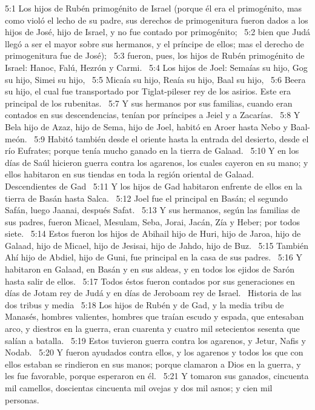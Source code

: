 5:1 Los hijos de Rubén primogénito de Israel (porque él era el primogénito, mas como violó el lecho de su padre, sus derechos de primogenitura fueron dados a los hijos de José, hijo de Israel, y no fue contado por primogénito;  
5:2 bien que Judá llegó a ser el mayor sobre sus hermanos, y el príncipe de ellos; mas el derecho de primogenitura fue de José);  
5:3 fueron, pues, los hijos de Rubén primogénito de Israel: Hanoc, Falú, Hezrón y Carmi.  
5:4 Los hijos de Joel: Semaías su hijo, Gog su hijo, Simei su hijo,  
5:5 Micaía su hijo, Reaía su hijo, Baal su hijo,  
5:6 Beera su hijo, el cual fue transportado por Tiglat-pileser rey de los asirios. Este era principal de los rubenitas.  
5:7 Y sus hermanos por sus familias, cuando eran contados en sus descendencias, tenían por príncipes a Jeiel y a Zacarías.  
5:8 Y Bela hijo de Azaz, hijo de Sema, hijo de Joel, habitó en Aroer hasta Nebo y Baal-meón.  
5:9 Habitó también desde el oriente hasta la entrada del desierto, desde el río Eufrates; porque tenía mucho ganado en la tierra de Galaad.  
5:10 Y en los días de Saúl hicieron guerra contra los agarenos, los cuales cayeron en su mano; y ellos habitaron en sus tiendas en toda la región oriental de Galaad.  
Descendientes de Gad  
5:11 Y los hijos de Gad habitaron enfrente de ellos en la tierra de Basán hasta Salca.  
5:12 Joel fue el principal en Basán; el segundo Safán, luego Jaanai, después Safat.  
5:13 Y sus hermanos, según las familias de sus padres, fueron Micael, Mesulam, Seba, Jorai, Jacán, Zía y Heber; por todos siete.  
5:14 Estos fueron los hijos de Abihail hijo de Huri, hijo de Jaroa, hijo de Galaad, hijo de Micael, hijo de Jesisai, hijo de Jahdo, hijo de Buz.  
5:15 También Ahí hijo de Abdiel, hijo de Guni, fue principal en la casa de sus padres.  
5:16 Y habitaron en Galaad, en Basán y en sus aldeas, y en todos los ejidos de Sarón hasta salir de ellos.  
5:17 Todos éstos fueron contados por sus generaciones en días de Jotam rey de Judá y en días de Jeroboam rey de Israel.  
Historia de las dos tribus y media  
5:18 Los hijos de Rubén y de Gad, y la media tribu de Manasés, hombres valientes, hombres que traían escudo y espada, que entesaban arco, y diestros en la guerra, eran cuarenta y cuatro mil setecientos sesenta que salían a batalla.  
5:19 Estos tuvieron guerra contra los agarenos, y Jetur, Nafis y Nodab.  
5:20 Y fueron ayudados contra ellos, y los agarenos y todos los que con ellos estaban se rindieron en sus manos; porque clamaron a Dios en la guerra, y les fue favorable, porque esperaron en él.  
5:21 Y tomaron sus ganados, cincuenta mil camellos, doscientas cincuenta mil ovejas y dos mil asnos; y cien mil personas.  
